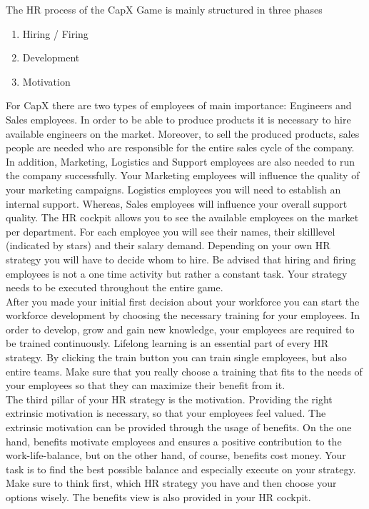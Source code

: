 The HR process of the CapX Game is mainly structured in three phases
\begin{enumerate}
    \item Hiring / Firing
    \item Development
    \item Motivation
\end{enumerate}
For CapX there are two types of employees of main importance: Engineers and Sales employees. In order to be able to produce products it is necessary to hire available engineers on the market. Moreover, to sell the produced products, sales people are needed who are responsible for the entire sales cycle of the company.\\
In addition, Marketing, Logistics and Support employees are also needed to run the company successfully. Your Marketing employees will influence the quality of your marketing campaigns. Logistics employees you will need to establish an internal support. Whereas, Sales employees will influence your overall support quality.
The HR cockpit allows you to see the available employees on the market per department. For each employee you will see their names, their skilllevel (indicated by stars) and their salary demand. Depending on your own HR strategy you will have to decide whom to hire. Be advised that hiring and firing employees is not a one time activity but rather a constant task. Your strategy needs to be executed throughout the entire game. \\
After you made your initial first decision about your workforce you can start the workforce development by choosing the necessary training for your employees. In order to develop, grow and gain new knowledge, your employees are required to be trained continuously. Lifelong learning is an essential part of every HR strategy. By clicking the train button you can train single employees, but also entire teams. Make sure that you really choose a training that fits to the needs of your employees so that they can maximize their benefit from it. \\
The third pillar of your HR strategy is the motivation. Providing the right extrinsic motivation is necessary, so that your employees feel valued. The extrinsic motivation can be provided through the usage of benefits. On the one hand, benefits motivate employees and ensures a positive contribution to the work-life-balance, but on the other hand, of course, benefits cost money. Your task is to find the best possible balance and especially execute on your strategy. Make sure to think first, which HR strategy you have and then choose your options wisely. The benefits view is also provided in your HR cockpit.
